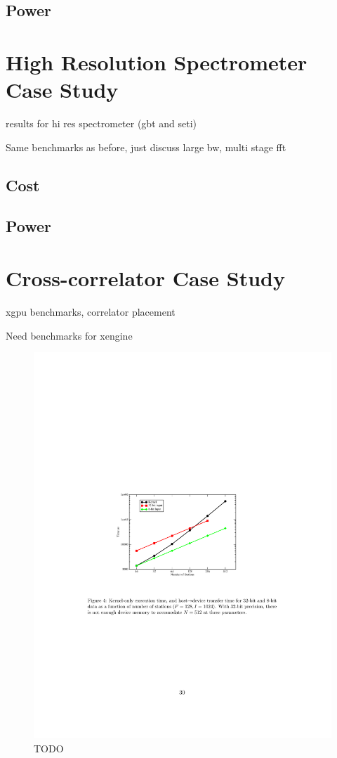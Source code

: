 \subsection{Power}

\section{High Resolution Spectrometer Case Study}
results for hi res spectrometer (gbt and seti)

Same benchmarks as before, just discuss large bw, multi stage fft
\subsection{Cost}
\subsection{Power}

\section{Cross-correlator Case Study}
xgpu benchmarks, correlator placement

Need benchmarks for xengine
\begin{figure}[ht!]
  \centering
    \includegraphics[width=\textwidth]{Images/C6/gpuxperformance.pdf}
  \caption{TODO}
  \label{fig: C6/gpuxperformance.pdf}
\end{figure}


